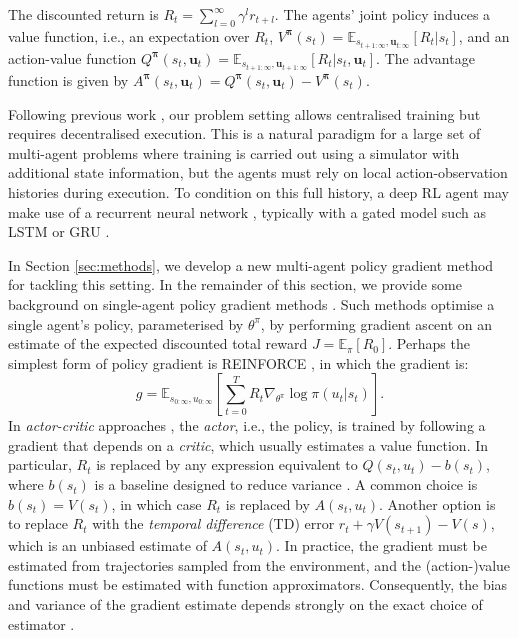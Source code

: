 \documentclass[letterpaper]{article}
\newcommand{\citep}{\cite}
\newcommand{\myvec}[1]{\mathbf{#1}}
\newcommand{\myvecsym}[1]{\boldsymbol{#1}}
\newcommand{\vpi}{\myvecsym{\pi}}
\newcommand{\vu}{\myvec{u}}
\newcommand{\exs}[2]{{\mathbb E_{#1}}\left[ #2 \right]}
\begin{document}
The discounted return is $R_t = \sum_{l=0}^\infty \gamma^l r_{t+l}$. The agents' joint policy induces a value function, i.e., an expectation over $R_t$, $V^{\vpi}(s_t) = \exs{s_{t+1:\infty},\vu_{t:\infty}}{R_t|s_t}$, and an action-value function $Q^{\vpi}(s_t, \vu_t) = \exs{s_{t+1:\infty},\vu_{t+1:\infty}}{R_t|s_t,\vu_t}$. The advantage function is given by $A^{\vpi}(s_t, \vu_t) = Q^{\vpi}(s_t, \vu_t) - V^{\vpi}(s_t)$.

Following previous work 
\citep{Oliehoek08JAIR,kraemer2016multi,foerster2016learning,jorge2016learning}, 
our problem setting allows centralised training but requires 
decentralised execution. This is a natural paradigm for a large set of 
multi-agent problems where training is carried out using a simulator with 
additional state information, but the agents must rely on local 
action-observation histories during execution. To condition on this full 
history, a deep RL agent may make use of a recurrent neural network 
\citep{hausknecht2015deep}, typically with a gated model such as LSTM 
\citep{hochreiter1997long} or GRU \citep{cho2014properties}.

In Section \ref{sec:methods}, we develop a new multi-agent policy gradient 
method for tackling this setting.  In the remainder of this section, we provide 
some background on single-agent policy gradient methods 
\citep{sutton1999policy}. Such methods optimise a single agent's policy, 
parameterised by $\theta^\pi$, by performing gradient ascent on an estimate of 
the expected discounted total reward $J = \exs{\pi}{R_0}$. Perhaps the simplest 
form of policy gradient is REINFORCE \citep{williams1992simple}, in which the 
gradient is:
\begin{equation}
g = \exs{s_{0:\infty},u_{0:\infty}}{\sum_{t=0}^{T} R_t \nabla_{\theta^{\pi}} \log \pi (u_t \vert s_t) }.
\end{equation}
In \emph{actor-critic} approaches 
\citep{sutton1999policy,konda2000actor,DBLP:journals/corr/SchulmanMLJA15},
 the \emph{actor}, i.e., the policy, is trained by following a gradient that 
depends on a \emph{critic}, which usually estimates a value function. In 
particular, $R_t$ is replaced by any expression equivalent to $Q(s_t, u_t) - 
b(s_t)$, where $b(s_t)$  is a baseline designed to reduce variance 
\citep{weaver2001optimal}.  A common choice is $b(s_t) = V(s_t)$, in which case 
$R_t$ is replaced by $A(s_t, u_t)$.  Another option is to replace $R_t$ with 
the \emph{temporal difference} (TD) error $r_t + \gamma V(s_{t+1}) - V(s)$, 
which is an unbiased estimate of $A(s_t, u_t)$. In practice, the gradient must 
be estimated from trajectories sampled from the environment, and the 
(action-)value functions must be estimated with function approximators. 
Consequently, the bias and variance of the gradient estimate depends strongly 
on the exact choice of estimator \citep{konda2000actor}. 
\end{document}
